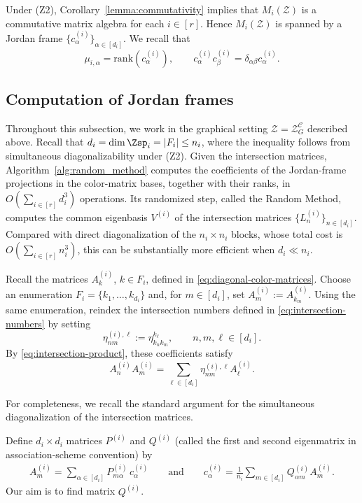 \documentclass[12pt]{amsart}
\theoremstyle{plain}
\theoremstyle{definition}
\theoremstyle{remark}
\newcommand{\1}{\mathbf{1}}
\begin{document}
Under (Z2), Corollary~\ref{lemma:commutativity} implies that
$M_i(\mathcal{Z})$ is a commutative matrix algebra for each $i\in[r]$.
Hence $M_i(\mathcal{Z})$ is spanned by a Jordan frame
$\{c^{(i)}_\alpha\}_{\alpha\in[d_i]}$.
We recall that
\[
  \mu_{i,\alpha} = \mathrm{rank}(c^{(i)}_\alpha),\qquad
  c^{(i)}_\alpha c^{(i)}_\beta = \delta_{\alpha\beta} c^{(i)}_\alpha.
\]




\subsection{Computation of Jordan frames}
\label{sec:random_method}

Throughout this subsection, we work in the graphical setting
$\mathcal Z=\mathcal Z_G^{\mathcal C}$ described above.
Recall that $d_i=\dim\Zsp_i=|F_i|\le n_i$, where the inequality
follows from simultaneous diagonalizability under (Z2).
Given the intersection matrices,
Algorithm~\ref{alg:random_method} computes the coefficients of the
Jordan-frame projections in the color-matrix bases, together with
their ranks, in $O(\sum_{i\in[r]}d_i^3)$ operations.
Its randomized step, called the Random Method, computes the common
eigenbasis $V^{(i)}$ of the intersection matrices
$\{L_n^{(i)}\}_{n\in[d_i]}$.
Compared with direct diagonalization of the $n_i\times n_i$
blocks, whose total cost is $O(\sum_{i\in[r]}n_i^3)$,
this can be substantially more efficient when $d_i\ll n_i$.

Recall the matrices $A_k^{(i)}$, $k\in F_i$, defined in \eqref{eq:diagonal-color-matrices}. Choose an enumeration $F_i=\{k_1,\ldots,k_{d_i}\}$ and, for $m\in[d_i]$, set $A_m^{(i)}:=A_{k_m}^{(i)}$. Using the same enumeration, reindex the intersection numbers defined in \eqref{eq:intersection-numbers} by setting
\[
\eta_{nm}^{(i),\ell}:=\eta_{k_nk_m}^{k_\ell},
\qquad n,m,\ell\in[d_i].
\]
By \eqref{eq:intersection-product}, these coefficients satisfy
\begin{equation}\label{eq:local-intersection-product}
A_n^{(i)}A_m^{(i)}=\sum_{\ell\in[d_i]}\eta_{nm}^{(i),\ell}A_\ell^{(i)}.
\end{equation}

For completeness, we recall the standard argument for the
simultaneous diagonalization of the intersection matrices.

Define $d_i\times d_i$ matrices $P^{(i)}$ and $Q^{(i)}$ (called the first and second eigenmatrix in association-scheme convention) by 
\begin{align}\label{eq:APQ}
A_m^{(i)} = \sum_{\alpha\in[d_i]} P_{m\alpha}^{(i)}\,c_\alpha^{(i)}\qquad\mbox{and}\qquad c_\alpha^{(i)} = \frac1{n_i}\sum_{m\in[d_i]} Q_{\alpha m}^{(i)} A_m^{(i)}.
\end{align}
Our aim is to find matrix $Q^{(i)}$.
\end{document}
